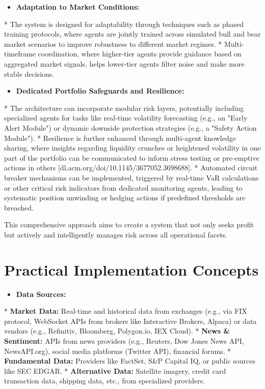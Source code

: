 \documentclass[11pt,a4paper]{article}
\begin{document}
\begin{itemize}
\item   \textbf{Adaptation to Market Conditions:}
\end{itemize}
    *   The system is designed for adaptability through techniques such as phased training protocols, where agents are jointly trained across simulated bull and bear market scenarios to improve robustness to different market regimes.
    *   Multi-timeframe coordination, where higher-tier agents provide guidance based on aggregated market signals, helps lower-tier agents filter noise and make more stable decisions.

\begin{itemize}
\item   \textbf{Dedicated Portfolio Safeguards and Resilience:}
\end{itemize}
    *   The architecture can incorporate modular risk layers, potentially including specialized agents for tasks like real-time volatility forecasting (e.g., an "Early Alert Module") or dynamic downside protection strategies (e.g., a "Safety Action Module").
    *   Resilience is further enhanced through multi-agent knowledge sharing, where insights regarding liquidity crunches or heightened volatility in one part of the portfolio can be communicated to inform stress testing or pre-emptive actions in others [dl.acm.org/doi/10.1145/3677052.3698688].
    *   Automated circuit breaker mechanisms can be implemented, triggered by real-time VaR calculations or other critical risk indicators from dedicated monitoring agents, leading to systematic position unwinding or hedging actions if predefined thresholds are breached.

This comprehensive approach aims to create a system that not only seeks profit but actively and intelligently manages risk across all operational facets.

\section{Practical Implementation Concepts}

\begin{itemize}
\item   \textbf{Data Sources:}
\end{itemize}
    *   \textbf{Market Data:} Real-time and historical data from exchanges (e.g., via FIX protocol, WebSocket APIs from brokers like Interactive Brokers, Alpaca) or data vendors (e.g., Refinitiv, Bloomberg, Polygon.io, IEX Cloud).
    *   \textbf{News \& Sentiment:} APIs from news providers (e.g., Reuters, Dow Jones News API, NewsAPI.org), social media platforms (Twitter API), financial forums.
    *   \textbf{Fundamental Data:} Providers like FactSet, S\&P Capital IQ, or public sources like SEC EDGAR.
    *   \textbf{Alternative Data:} Satellite imagery, credit card transaction data, shipping data, etc., from specialized providers.
\end{document}
